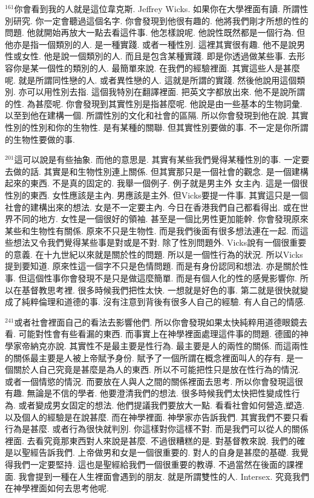 \documentclass{book}
\begin{document}
$^{161}$你會看到我的人就是這位韋克斯.
Jeffrey Wicks.
如果你在大學裡面有讀.
所謂性別研究.
你一定會聽過這個名字.
你會發現到他很有趣的.
他將我們剛才所想的性的問題.
他就開始再放大一點去看這件事.
他怎樣說呢.
他說性既然都是一個行為.
但他亦是指一個類別的人.
是一種實踐.
或者一種性別.
這裡其實很有趣.
他不是說男性或女性.
他是說一個類別的人.
而且是包含某種實踐.
即是你透過做某些事.
去形容你是某一個性的類別的人.
最簡單來說.
在我們的經驗裡面.
其實這些人是甚麼呢.
就是所謂同性戀的人.
或者異性戀的人.
這就是所謂的實踐.
然後他說用這個類別.
亦可以用性別去指.
這個我特別在翻譯裡面.
把英文字都放出來.
他不是說所謂的性.
為甚麼呢.
你會發現到其實性別是指甚麼呢.
他說是由一些基本的生物詞彙.
以至到他在建構一個.
所謂性別的文化和社會的區隔.
所以你會發現到他在說.
其實性別的性別和你的生物性.
是有某種的關聯.
但其實性別要做的事.
不一定是你所謂的生物性要做的事.

$^{201}$這可以說是有些抽象.
而他的意思是.
其實有某些我們覺得某種性別的事.
一定要去做的話.
其實是和生物性別連上關係.
但其實那只是一個社會的觀念.
是一個建構起來的東西.
不是真的固定的.
我舉一個例子.
例子就是男主外 女主內.
這是一個很性別的東西.
女性應該是主內.
男應該是主外.
但Vicks要提一件事.
其實這只是一個社會的建構出來的想法.
女是不一定要主內.
今日在香港我們自己都看得出.
或在世界不同的地方.
女性是一個很好的領袖.
甚至是一個比男性更加能幹.
你會發現原來某些和生物性有關係.
原來不只是生物性.
而是我們後面有很多想法連在一起.
而這些想法又令我們覺得某些事是對或是不對.
除了性別問題外.
Vicks說有一個很重要的意義.
在十九世紀以來就是關於性的問題.
所以是一個性行為的狀況.
所以Vicks提到要知道.
原來性這一個字不只是色情問題.
而是有身份認同和想法.
亦是關於性事.
但這個性事你會發現不是只是做這麼簡單.
而是有個人化的性的感覺影響你.
所以在基督教思考裡.
很多時候我們把性太快.
一想就是好色的事.
第二就是很快就變成了純粹倫理和道德的事.
沒有注意到背後有很多人自己的經驗.
有人自己的情感.

$^{241}$或者社會裡面自己的看法去影響他們.
所以你會發現如果太快純粹用道德眼鏡去看.
可能對性會有些看漏的東西.
而事實上在神學裡面處理這件事的問題.
德國的神學家帝納克亦說.
其實性不是最主要是性行為.
最主要是人的兩性的關係.
而這兩性的關係最主要是人被上帝賦予身份.
賦予了一個所謂在概念裡面叫人的存有.
是一個關於人自己究竟是甚麼是為人的東西.
所以不可能把性只是放在性行為的情況.
或者一個情慾的情況.
而要放在人與人之間的關係裡面去思考.
所以你會發現這很有趣.
無論是不信的學者.
他要澄清我們的想法.
很多時候我們太快把性變成性行為.
或者變成男女固定的想法.
他們提議我們要放大一點.
看看社會如何營造,塑造.
以及個人的經驗是在說甚麼.
而在神學裡面.
神學家亦告訴我們.
其實我們不要只看行為是甚麼.
或者行為很快就判別.
你這樣對你這樣不對.
而是我們可以從人的關係裡面.
去看究竟那東西對人來說是甚麼.
不過很糟糕的是.
對基督教來說.
我們的確是以聖經告訴我們.
上帝做男和女是一個很重要的.
對人的自身是甚麼的基礎.
我覺得我們一定要堅持.
這也是聖經給我們一個很重要的教導.
不過當然在後面的課裡面.
我會提到一種在人生裡面會遇到的朋友.
就是所謂雙性的人.
Intersex.
究竟我們在神學裡面如何去思考他呢.
\end{document}
